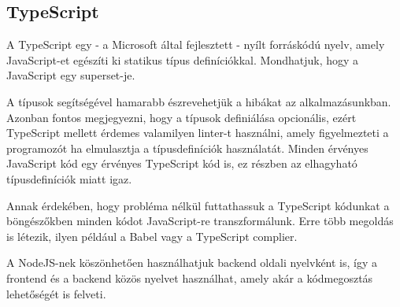 \subsection{TypeScript}

A TypeScript egy - a Microsoft által fejlesztett - nyílt forráskódú nyelv, amely JavaScript-et egészíti ki statikus típus definíciókkal. Mondhatjuk, hogy a JavaScript egy superset-je.

A típusok segítségével hamarabb észrevehetjük a hibákat az alkalmazásunkban. Azonban fontos megjegyezni, hogy a típusok definiálása opcionális, ezért TypeScript mellett érdemes valamilyen linter-t használni, amely figyelmezteti a programozót ha elmulasztja a típusdefiníciók használatát. 
Minden érvényes JavaScript kód egy érvényes TypeScript kód is, ez részben az elhagyható típusdefiníciók miatt igaz.

Annak érdekében, hogy probléma nélkül futtathassuk a TypeScript kódunkat a böngészőkben minden kódot JavaScript-re transzformálunk. Erre több megoldás is létezik, ilyen például a Babel vagy a TypeScript complier.

A NodeJS-nek köszönhetően használhatjuk backend oldali nyelvként is, így a frontend és a backend közös nyelvet használhat, amely akár a kódmegosztás lehetőségét is felveti.
